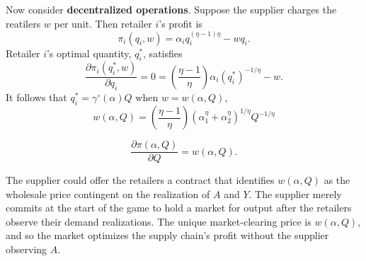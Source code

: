 Now consider \textbf{decentralized operations}. 
Suppose the supplier charges the reatilers $w$ per unit. Then retailer $i$'s profit is 
\begin{equation*}
    \pi_i(q_i,w)=\alpha_i q_i^{(\eta-1)\eta}-w q_i.
\end{equation*}
Retailer $i$'s optimal quantity, $q_{i}^{*}$, satisfies
$$
\frac{\partial \pi_{i}\left(q_{i}^{*}, w\right)}{\partial q_{i}}=0=\left(\frac{\eta-1}{\eta}\right) \alpha_{i}\left(q_{i}^{*}\right)^{-1 / \eta}-w .
$$
It follows that $q_{i}^{*}=\gamma^{\circ}(\alpha) Q$ when $w=w(\alpha, Q)$,
$$
w(\alpha, Q)=\left(\frac{\eta-1}{\eta}\right)\left(\alpha_{1}^{\eta}+\alpha_{2}^{\eta}\right)^{1 / \eta} Q^{-1 / \eta}
$$
\begin{note}
    $$\frac{\partial\pi(\alpha,Q)}{\partial Q}=w(\alpha,Q).$$
\end{note}

The supplier could offer the retailers a contract that identifies $w(\alpha,Q)$ as the wholesale price contingent on the realization of $A$ and $Y$. The supplier merely commits at the start of the game to hold a market for output after the retailers observe their demand realizations. The unique market-clearing price is $w(\alpha,Q)$, and so the market optimizes the supply chain's profit without the supplier observing $A$.










